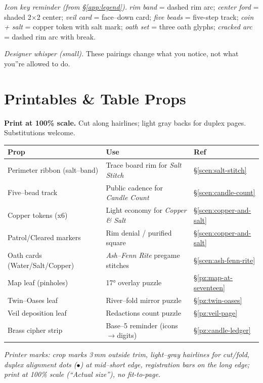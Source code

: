 \documentclass[11pt]{article}
\numberwithin{equation}{section} %
\theoremstyle{plain} %
\theoremstyle{definition} %
\theoremstyle{remark} %
\begin{document}
\medskip
\noindent\textit{Icon key reminder (from \S\ref{app:legend}).} \textit{rim band} = dashed rim arc; \textit{center ford} = shaded 2×2 center; \textit{veil card} = face--down card; \textit{five beads} = five-step track; \textit{coin + salt} = copper token with salt mark; \textit{oath set} = three oath glyphs; \textit{cracked arc} = dashed rim arc with break.

\medskip
\noindent\textit{Designer whisper (small).} These pairings change what you notice, not what you''re allowed to do.

\clearpage
\section{Printables \& Table Props}
\label{app:printables}

\noindent\textbf{Print at 100\% scale.} Cut along hairlines; light gray backs for duplex pages. Substitutions welcome.

\medskip
\begin{tabular}{p{5.2cm} p{5.6cm} p{3.7cm}}
\toprule
\textbf{Prop} & \textbf{Use} & \textbf{Ref}\\
\midrule
Perimeter ribbon (salt--band) & Trace board rim for \emph{Salt Stitch} & \S\ref{scen:salt-stitch}\\
Five--bead track & Public cadence for \emph{Candle Count} & \S\ref{scen:candle-count}\\
Copper tokens (x6) & Light economy for \emph{Copper \& Salt} & \S\ref{scen:copper-and-salt}\\
Patrol/Cleared markers & Rim denial / purified square & \S\ref{scen:copper-and-salt}\\
Oath cards (Water/Salt/Copper) & \emph{Ash--Fenn Rite} pregame stitches & \S\ref{scen:ash-fenn-rite}\\
Map leaf (pinholes) & 17° overlay puzzle & \S\ref{pz:map-at-seventeen}\\
Twin--Oases leaf & River--fold mirror puzzle & \S\ref{pz:twin-oases}\\
Veil deposition leaf & Redactions count puzzle & \S\ref{pz:veil-page}\\
Brass cipher strip & Base--5 reminder (icons$\rightarrow$digits) & \S\ref{pz:candle-ledger}\\
\bottomrule
\end{tabular}
\medskip
\noindent\textit{Printer marks: crop marks 3\,mm outside trim, light--gray hairlines for cut/fold, duplex alignment dots (\(\bullet\)) at mid--short edge, registration bars on the long edge; print at 100\% scale (``Actual size''), no fit-to-page.}
\end{document}
